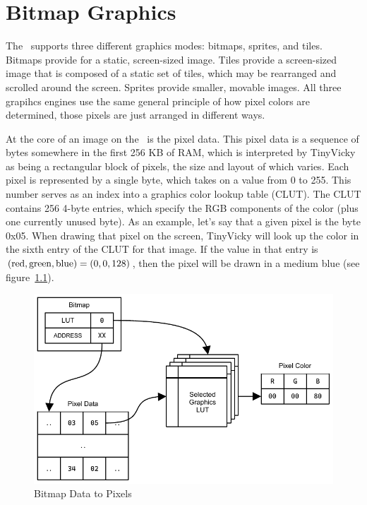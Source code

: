 \chapter{Bitmap Graphics}

The \jr\ supports three different graphics modes: bitmaps, sprites, and tiles. Bitmaps provide for a static, screen-sized image. Tiles provide a screen-sized image that is composed of a static set of tiles, which may be rearranged and scrolled around the screen. Sprites provide smaller, movable images. All three grapihcs engines use the same general principle of how pixel colors are determined, those pixels are just arranged in different ways.

At the core of an image on the \jr\ is the pixel data. This pixel data is a sequence of bytes somewhere in the first 256 KB of RAM, which is interpreted by TinyVicky as being a rectangular block of pixels, the size and layout of which varies. Each pixel is represented by a single byte, which takes on a value from 0 to 255. This number serves as an index into a graphics color lookup table (CLUT). The CLUT contains 256 4-byte entries, which specify the RGB components of the color (plus one currently unused byte). As an example, let's say that a given pixel is the byte 0x05. When drawing that pixel on the screen, TinyVicky will look up the color in the sixth entry of the CLUT for that image. If the value in that entry is $({\rm red}, {\rm green}, {\rm blue}) = (0, 0, 128)$, then the pixel will be drawn in a medium blue (see figure~\ref{fig:bitmap_colors}).

\begin{figure}[h]
    \begin{center}
        \includegraphics{images/bitmaps.pdf}
    \end{center}
    \caption{Bitmap Data to Pixels}
    \label{fig:bitmap_colors}
\end{figure}

